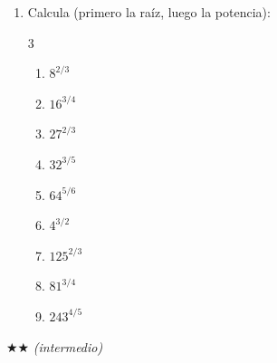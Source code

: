 \documentclass[11pt, letterpaper]{article}
\begin{document}
\begin{enumerate}[label=\textbf{\arabic*.}, leftmargin=*]
  \item Calcula (primero la raíz, luego la potencia):
  \begin{multicols}{3}
  \begin{enumerate}[label=\alph*)]
    \item $8^{2/3}$
    \item $16^{3/4}$
    \item $27^{2/3}$
    \item $32^{3/5}$
    \item $64^{5/6}$
    \item $4^{3/2}$
    \item $125^{2/3}$
    \item $81^{3/4}$
    \item $243^{4/5}$
  \end{enumerate}
  \end{multicols}
\end{enumerate}

$\bigstar\bigstar$ \textit{(intermedio)}
\end{document}
